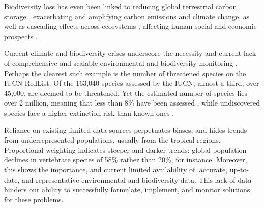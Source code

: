 Biodiversity loss has even been linked to reducing global terrestrial carbon storage \cite{Weiskopf2024}, exacerbating and amplifying carbon emissions and climate change, as well as cascading effects across ecosystems \cite{Rosenberg2019, Ceballos2015}, affecting human social and economic prospects \cite{Frank2024, Portner2023}.


Current climate and biodiversity crises \cite{Pereira2024, Weiskopf2024, Pimm2014, Portner2023} underscore the necessity and current lack of comprehensive and scalable environmental and biodiversity monitoring \cite{Gonzalez2023a, McRae2017, Gonzalez2016, Mora2011}. 
Perhaps the clearest such example is the number of threatened species on the IUCN RedList. Of the 163,040 species assessed by the IUCN, almost a third, over 45,000, are deemed to be threatened. Yet the estimated number of species lies over 2 million, meaning that less than 8\% have been assessed \cite{IUCN2024}, while undiscovered species face a higher extinction risk than known ones \cite{Liu2022a}.

Reliance on existing limited data sources perpetuates biases, and hides trends from underrepresented populations, usually from the tropical regions. Proportional weighting indicates steeper and darker trends: global population declines in vertebrate species of 58\% rather than 20\%, for instance\cite{McRae2017}. Moreover, this shows the importance, and current limited availability of, accurate, up-to-date, and representative environmental and biodiversity data. This lack of data hinders our ability to successfully  formulate, implement, and monitor solutions for these problems. 



